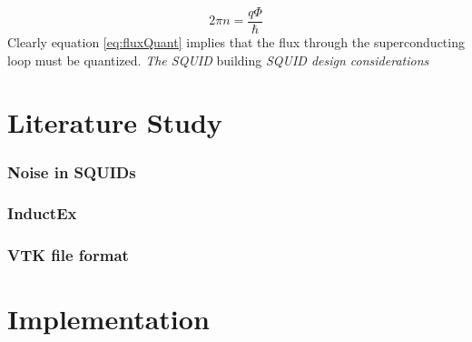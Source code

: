 \begin{equation}
    2\pi n = \frac{q\Phi}{\hbar}
    \label{eq:fluxQuant}
\end{equation}
Clearly equation \ref{eq:fluxQuant} implies that the flux through the superconducting loop must be quantized. 
\newline
\textit{The SQUID}
\newline
building
\newline
\textit{SQUID design considerations}
\newpage
\section{Literature Study}
\subsubsection{Noise in SQUIDs}
\subsubsection{InductEx}
\subsubsection{VTK file format}
\section{Implementation}


